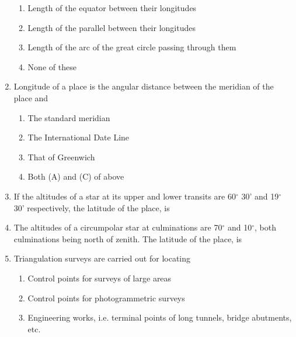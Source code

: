 \documentclass[11pt,a4paper]{article}
\begin{document}
\begin{enumerate}
\begin{enumerate}[label=\Alph*.]
\item{Length of the equator between their longitudes}
\item{Length of the parallel between their longitudes}
\item{Length of the arc of the great circle passing through them}
\item{None of these}
\end{enumerate}
\item{Longitude of a place is the angular distance between the meridian of the place and}
\begin{enumerate}[label=\Alph*.]
\item{The standard meridian}
\item{The International Date Line}
\item{That of Greenwich}
\item{Both (A) and (C) of above}
\end{enumerate}
\item{If the altitudes of a star at its upper and lower transits are 60$^\circ$ 30' and 19$^\circ$ 30' respectively, the latitude of the place, is
}
\\
\item{The altitudes of a circumpolar star at culminations are 70$^\circ$ and 10$^\circ$, both culminations being north of zenith. The latitude of the place, is
}
\\
\item{Triangulation surveys are carried out for locating}
\begin{enumerate}[label=\Alph*.]
\item{Control points for surveys of large areas}
\item{Control points for photogrammetric surveys}
\item{Engineering works, i.e. terminal points of long tunnels, bridge abutments, etc.}

\end{enumerate}
\end{enumerate}
\end{document}
